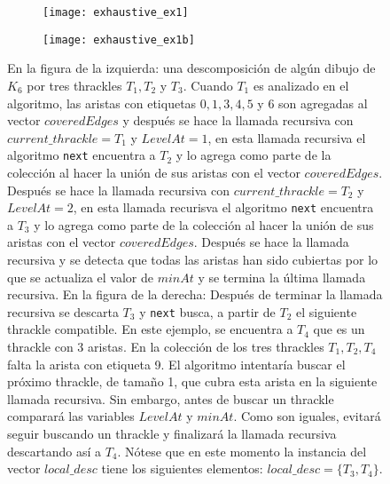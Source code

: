   \begin{figure}
    \centering
    \begin{subfigure}{.5\textwidth}
      \centering
      \texttt{[image: exhaustive\_ex1]}

    \end{subfigure}\hfill%
    \begin{subfigure}{.5\textwidth}
      \centering
      \texttt{[image: exhaustive\_ex1b]}

    \end{subfigure}\hfill%
    \caption{En la figura de la izquierda: una descomposición de algún dibujo de $K_6$ por tres thrackles
    $T_1,T_2$ y $T_3$. Cuando $T_1$ es analizado en el algoritmo, las aristas con etiquetas $0,1,3,4,5$ y
    $6$ son agregadas al vector $coveredEdges$ y después se hace la llamada recursiva con
    $current\_thrackle=T_1$ y $LevelAt=1$, en esta llamada recursiva el algoritmo \texttt{next}
    encuentra a $T_2$ y lo agrega como parte de la colección al hacer la unión de sus aristas con el vector
    $coveredEdges$. Después se  hace la llamada recursiva con $current\_thrackle=T_2$ y $LevelAt=2$, en
    esta llamada recurisva el algoritmo \texttt{next} encuentra a $T_3$ y lo agrega como parte de la
    colección al hacer la unión  de sus aristas con el vector $coveredEdges$. Después se hace la llamada
    recursiva y se detecta que todas las aristas han sido cubiertas por lo que se actualiza el valor de
    $minAt$ y se termina la última llamada recursiva. En la figura de la derecha: Después de terminar la
    llamada recursiva se descarta $T_3$ y \texttt{next} busca, a partir de $T_2$ el siguiente thrackle
    compatible. En este ejemplo, se encuentra a $T_4$ que es un thrackle con 3 aristas. En la colección de
    los tres thrackles $T_1,T_2,T_4$ falta la arista con etiqueta 9. El algoritmo intentaría buscar el
    próximo thrackle, de tamaño 1, que cubra esta arista en la siguiente llamada recursiva. Sin embargo,
    antes de buscar un thrackle comparará las variables $LevelAt$ y $minAt$. Como son iguales, evitará
    seguir buscando un thrackle y finalizará la llamada recursiva descartando así a $T_4$. Nótese que en este momento la instancia del vector $local\_desc$ tiene los siguientes elementos: $local\_desc=\{T_3,T_4\}$. }
    \label{fig:exhaustive1}
  \end{figure}

